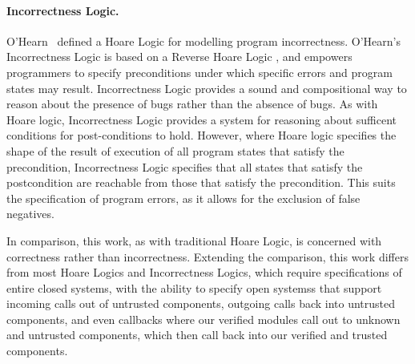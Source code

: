 \paragraph{Incorrectness Logic.} O'Hearn~\cite{IncorrectnessLogic} defined a Hoare
Logic for modelling program incorrectness. O'Hearn's Incorrectness Logic
is based on a Reverse Hoare Logic \cite{reverseHoare}, and empowers programmers to 
specify preconditions under which specific errors and program states may result. 
Incorrectness Logic provides a sound and compositional way to reason about 
the presence of bugs rather than the absence of bugs. 
As with Hoare logic, Incorrectness Logic provides a system
for reasoning about sufficent conditions for post-conditions to hold.
However, where Hoare logic specifies the shape of the result of execution 
of all program states that satisfy the precondition, Incorrectness Logic
specifies that all states that satisfy the postcondition are reachable
from those that satisfy the precondition. This suits the specification
of program errors, as it allows for the exclusion of false negatives.




In comparison, this work, as with traditional Hoare Logic, is
concerned with correctness rather than incorrectness.
Extending the comparison,
this work 
differs from most Hoare Logics and Incorrectness Logics,
which require specifications of entire closed systems,
with the ability to specify open systemss that support incoming calls
out of untrusted components, outgoing calls back into untrusted
components, and even callbacks where
our verified modules call out to unknown and untrusted components,
which then call back into our verified and trusted components.


%


